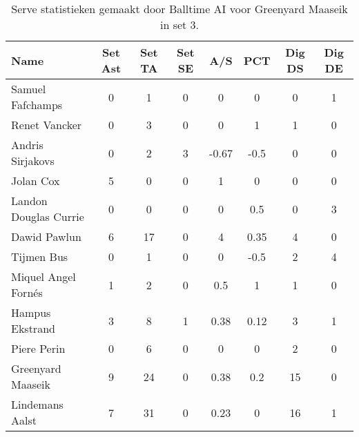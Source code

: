 \begin{table}[ht!]
  \centering
  \scriptsize
  \begin{tabular}{|l|c|c|c|c|c|c|c|} \hline
    \textbf{Name} & Set Ast & Set TA & Set SE & A/S & PCT & Dig DS & Dig DE \\ \hline
    Samuel Fafchamps & 0 & 1 & 0 & 0 & 0 & 0 & 1 \\
    Renet Vancker & 0 & 3 & 0 & 0 & 1 & 1 & 0 \\
    Andris Sirjakovs & 0 & 2 & 3 & -0.67 & -0.5 & 0 & 0 \\
    Jolan Cox & 5 & 0 & 0 & 1 & 0 & 0 & 0 \\
    Landon Douglas Currie & 0 & 0 & 0 & 0 & 0.5 & 0 & 3 \\
    Dawid Pawlun & 6 & 17 & 0 & 4 & 0.35 & 4 & 0 \\
    Tijmen Bus & 0 & 1 & 0 & 0 & -0.5 & 2 & 4 \\
    Miquel Angel Fornés & 1 & 2 & 0 & 0.5 & 1 & 1 & 0 \\
    Hampus Ekstrand & 3 & 8 & 1 & 0.38 & 0.12 & 3 & 1 \\
    Piere Perin & 0 & 6 & 0 & 0 & 0 & 2 & 0 \\
    Greenyard Maaseik & 9 & 24 & 0 & 0.38 & 0.2 & 15 & 0 \\
    Lindemans Aalst & 7 & 31 & 0 & 0.23 & 0 & 16 & 1 \\ \hline
  \end{tabular}
  \caption[Setting en digging statistieken gemaakt door Balltime AI voor Greenyard Maaseik in set 3]{\label{tab:PL1SetDigGreenyard3}Serve statistieken gemaakt door Balltime AI voor Greenyard Maaseik in set 3.}
\end{table}

